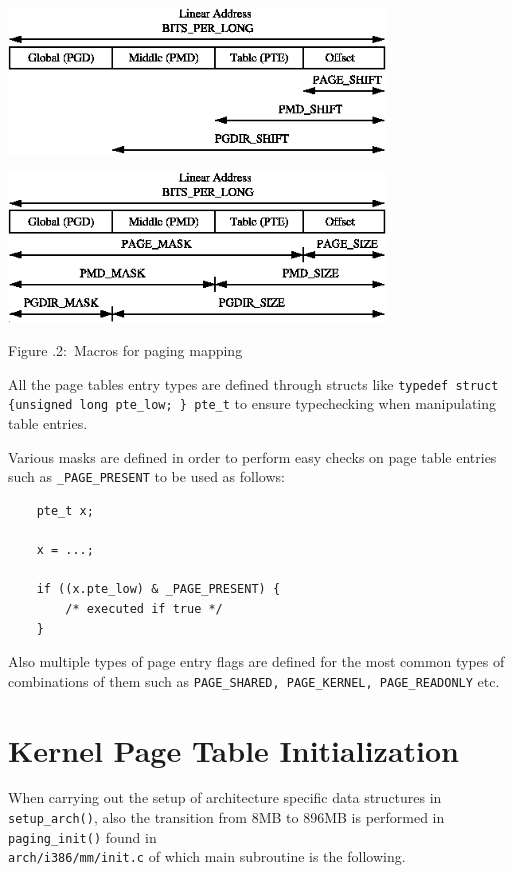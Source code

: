\documentclass[twoside]{article}
\newcounter{lecnum}
\newcommand{\fig}[3]{
            \vspace{#2}
            \begin{center}
            Figure \thelecnum.#1:~#3
            \end{center}
    }
\begin{document}
\begin{center}
  \includegraphics[width=0.75\textwidth]{bits1.png}
\end{center}


\begin{center}
  \includegraphics[width=0.75\textwidth]{bits2.png}
  \fig{2}{0 pt}{Macros for paging mapping}
\end{center}

All the page tables entry types are defined through structs like \texttt{typedef struct \{unsigned long pte_low; \} pte_t} to ensure typechecking when manipulating table entries.

Various masks are defined in order to perform easy checks on page table entries such as \texttt{_PAGE_PRESENT} to be used as follows:

\begin{verbatim}
    pte_t x;

    x = ...;

    if ((x.pte_low) & _PAGE_PRESENT) {
        /* executed if true */
    }
\end{verbatim}

Also multiple types of page entry flags are defined for the most common types of combinations of them such as \texttt{PAGE_SHARED, PAGE_KERNEL, PAGE_READONLY} etc.


\section{Kernel Page Table Initialization}

When carrying out the setup of architecture specific data structures in \texttt{setup_arch()}, also the transition from 8MB to 896MB is performed in \texttt{paging_init()} found in \\ \texttt{arch/i386/mm/init.c} of which main subroutine is the following.
\end{document}
